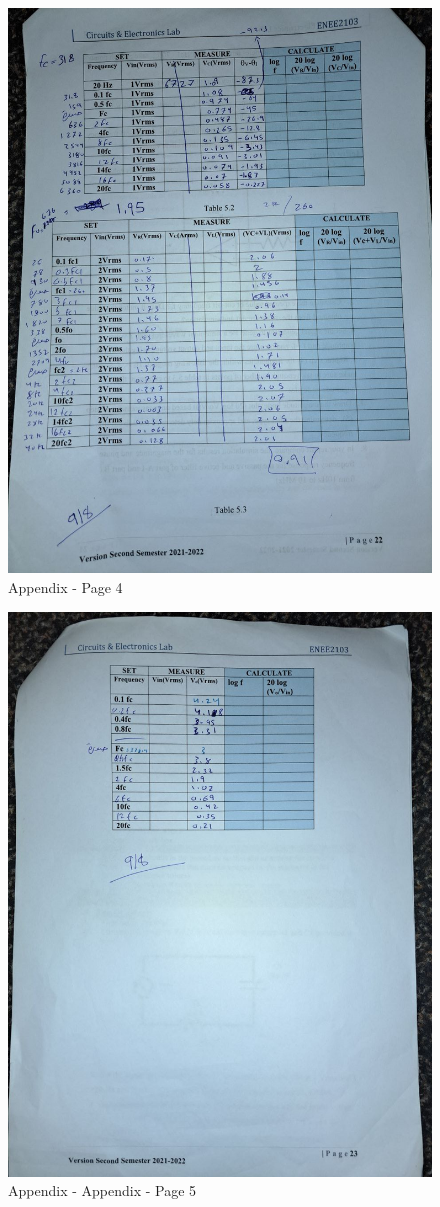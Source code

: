 \documentclass[12pt]{article}
\begin{document}
\begin{figure}[H]
    \centering
    \includegraphics[width=\textwidth, angle=270]{assets/i4.jpg}
    \caption{Appendix - Page 4}
\end{figure}

\begin{figure}[H]
    \centering
    \includegraphics[width=\textwidth, angle=270]{assets/i5.jpg}
    \caption{Appendix - Appendix - Page 5}
\end{figure}
\end{document}
